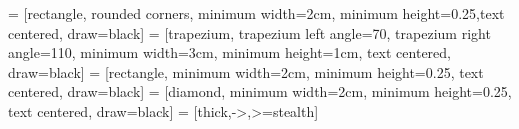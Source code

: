 

\usepackage[utf8]{inputenc}
\usepackage{amsmath}
\usepackage{verbatim}
\usepackage{amsfonts}
\usepackage{tikz}
\usetikzlibrary{arrows,automata,shapes.geometric}
\usepackage{amssymb}
\usepackage{graphicx}
\usepackage{listings}
\usepackage{textcomp}
\usepackage[hidelinks]{hyperref}
\usepackage{wrapfig}
\usepackage{subfig}
\setlength{\parskip}{1em}
\setlength{\parindent}{0pt}
\renewcommand{\familydefault}{\sfdefault}
\usepackage[left=3cm,right=3cm,top=3cm,bottom=3cm]{geometry}

 \renewcommand\lstlistingname{Quelltext} %
\let \it \textit
\let \bf \textbf
{}

 = [rectangle, rounded corners, minimum width=2cm, minimum height=0.25,text centered, draw=black]
 = [trapezium, trapezium left angle=70, trapezium right angle=110, minimum width=3cm, minimum height=1cm, text centered, draw=black]
 = [rectangle, minimum width=2cm, minimum height=0.25, text centered, draw=black]
 = [diamond, minimum width=2cm, minimum height=0.25, text centered, draw=black]
 = [thick,->,>=stealth]
